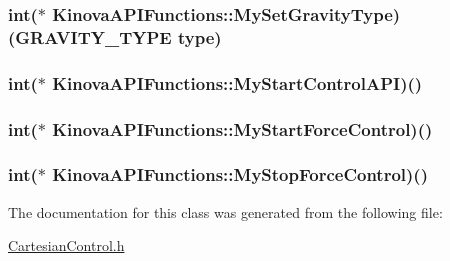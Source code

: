\subsubsection[{\texorpdfstring{My\+Set\+Gravity\+Type}{MySetGravityType}}]{\setlength{\rightskip}{0pt plus 5cm}int($\ast$ Kinova\+A\+P\+I\+Functions\+::\+My\+Set\+Gravity\+Type)(G\+R\+A\+V\+I\+T\+Y\+\_\+\+T\+Y\+PE type)}\hypertarget{classKinovaAPIFunctions_ae843b33c225f878073ad2c16bf71705e}{}\label{classKinovaAPIFunctions_ae843b33c225f878073ad2c16bf71705e}
\subsubsection[{\texorpdfstring{My\+Start\+Control\+A\+PI}{MyStartControlAPI}}]{\setlength{\rightskip}{0pt plus 5cm}int($\ast$ Kinova\+A\+P\+I\+Functions\+::\+My\+Start\+Control\+A\+PI)()}\hypertarget{classKinovaAPIFunctions_a60a8664e5435f4f718819f1272819fd5}{}\label{classKinovaAPIFunctions_a60a8664e5435f4f718819f1272819fd5}
\subsubsection[{\texorpdfstring{My\+Start\+Force\+Control}{MyStartForceControl}}]{\setlength{\rightskip}{0pt plus 5cm}int($\ast$ Kinova\+A\+P\+I\+Functions\+::\+My\+Start\+Force\+Control)()}\hypertarget{classKinovaAPIFunctions_a525d90a39a98a322f4c0bce674c53c6c}{}\label{classKinovaAPIFunctions_a525d90a39a98a322f4c0bce674c53c6c}
\subsubsection[{\texorpdfstring{My\+Stop\+Force\+Control}{MyStopForceControl}}]{\setlength{\rightskip}{0pt plus 5cm}int($\ast$ Kinova\+A\+P\+I\+Functions\+::\+My\+Stop\+Force\+Control)()}\hypertarget{classKinovaAPIFunctions_af64a7c26aa505a9820da3e76d123a2a2}{}\label{classKinovaAPIFunctions_af64a7c26aa505a9820da3e76d123a2a2}


The documentation for this class was generated from the following file\+:\begin{DoxyCompactItemize}
\item 
\hyperlink{CartesianControl_8h}{Cartesian\+Control.\+h}\end{DoxyCompactItemize}
